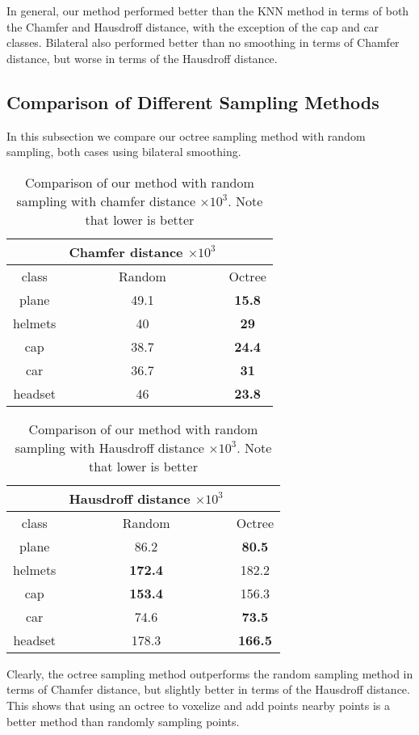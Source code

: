 In general, our method performed better than the KNN method in terms of both the Chamfer and Hausdroff distance, with the exception of the cap and car classes. 
Bilateral also performed better than no smoothing in terms of Chamfer distance, but worse in terms of the Hausdroff distance.

\subsection{Comparison of Different Sampling Methods}

In this subsection we compare our octree sampling method with random sampling, both cases using bilateral smoothing.

\begin{table}[H]
\centering
\begin{tabular}{ccc}
	& Chamfer distance $\times 10^3$ &\\
	\hline
	class & Random & Octree \\
	\hline
	plane & {49.1} & \textbf{15.8} \\ 
	helmets & {40} & \textbf{29} \\
	cap & {38.7} & \textbf{24.4} \\  
	car & {36.7} & \textbf{31} \\  
	headset & {46} & \textbf{23.8}  \\
\end{tabular}
\caption{Comparison of our method with random sampling with chamfer distance $\times 10^3$. Note that lower is better}
\end{table}

\begin{table}[H]
\centering
\begin{tabular}{ccc}
	& Hausdroff distance $\times 10^3$ &\\
	\hline
	class & Random & Octree \\
	\hline
	plane & 86.2 & \textbf{80.5} \\
	helmets & \textbf{172.4} &  {182.2}\\
cap & \textbf{153.4} & {156.3} \\
car & {74.6} & \textbf{73.5} \\
headset & 178.3 & \textbf{166.5} \\
\end{tabular}
\caption{Comparison of our method with random sampling with Hausdroff distance $\times 10^3$. Note that lower is better}
\end{table}

Clearly, the octree sampling method outperforms the random sampling method in terms of Chamfer distance, but slightly better in terms of the Hausdroff distance.
This shows that using an octree to voxelize and add points nearby points is a better method than randomly sampling points.
